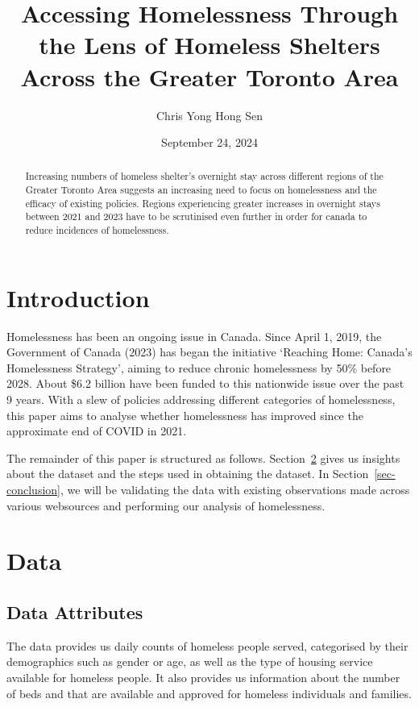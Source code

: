 \documentclass[
  letterpaper,
  DIV=11,
  numbers=noendperiod]{scrartcl}
\title{Accessing Homelessness Through the Lens of Homeless Shelters
Across the Greater Toronto Area}
\author{Chris Yong Hong Sen}
\date{September 24, 2024}
\begin{document}
\maketitle
\begin{abstract}
Increasing numbers of homeless shelter's overnight stay across different
regions of the Greater Toronto Area suggests an increasing need to focus
on homelessness and the efficacy of existing policies. Regions
experiencing greater increases in overnight stays between 2021 and 2023
have to be scrutinised even further in order for canada to reduce
incidences of homelessness.
\end{abstract}


\section{Introduction}\label{introduction}

Homelessness has been an ongoing issue in Canada. Since April 1, 2019,
the Government of Canada (2023) has began the initiative `Reaching Home:
Canada's Homelessness Strategy', aiming to reduce chronic homelessness
by 50\% before 2028. About \$6.2 billion have been funded to this
nationwide issue over the past 9 years. With a slew of policies
addressing different categories of homelessness, this paper aims to
analyse whether homelessness has improved since the approximate end of
COVID in 2021.

The remainder of this paper is structured as follows.
Section~\ref{sec-data} gives us insights about the dataset and the steps
used in obtaining the dataset. In Section~\ref{sec-conclusion}, we will
be validating the data with existing observations made across various
websources and performing our analysis of homelessness.

\newpage

\section{Data}\label{sec-data}

\subsection{\texorpdfstring{{Data
Attributes}}{Data Attributes}}\label{data-attributes}

The data provides us daily counts of homeless people served, categorised
by their demographics such as gender or age, as well as the type of
housing service available for homeless people. It also provides us
information about the number of beds and that are available and approved
for homeless individuals and families.
\end{document}
